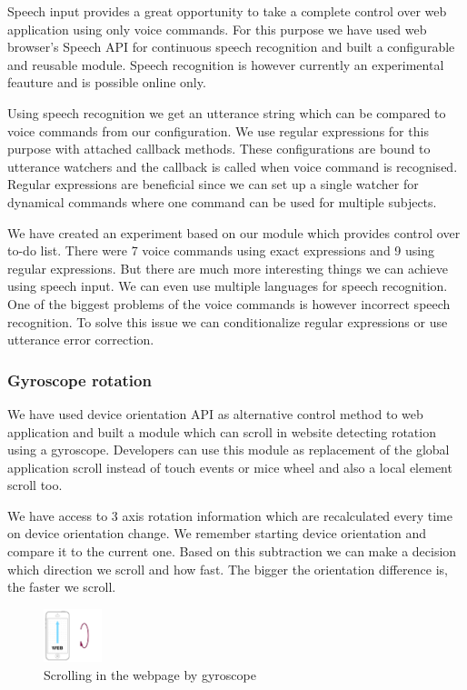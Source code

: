 \documentclass{iitsrc}
\begin{document}
Speech input provides a great opportunity to take a complete control over web application using only voice commands. For this purpose we have used web browser's Speech API for continuous speech recognition and built a configurable and reusable module. Speech recognition is however currently an experimental feauture and is possible online only.

Using speech recognition we get an utterance string which can be compared to voice commands from our configuration. We use regular expressions for this purpose with attached callback methods. These configurations are bound to utterance watchers and the callback is called when voice command is recognised. Regular expressions are beneficial since we can set up a single watcher for dynamical commands where one command can be used for multiple subjects.

We have created an experiment based on our module which provides control over to-do list. There were 7 voice commands using exact expressions and 9 using regular expressions. But there are much more interesting things we can achieve using speech input. We can even use multiple languages for speech recognition. One of the biggest problems of the voice commands is however incorrect speech recognition. To solve this issue we can conditionalize regular expressions or use utterance error correction.


\subsubsection*{Gyroscope rotation} %
\label{ssub:gyroscope_rotation}

We have used device orientation API as alternative control method to web application and built a module which can scroll in website detecting rotation using a gyroscope. Developers can use this module as replacement of the global application scroll instead of touch events or mice wheel and also a local element scroll too.

We have access to 3 axis rotation information which are recalculated every time on device orientation change. We remember starting device orientation and compare it to the current one. Based on this subtraction we can make a decision which direction we scroll and how fast. The bigger the orientation difference is, the faster we scroll.

\begin{figure}[ht]
    \begin{center}
        \includegraphics[width=0.15\textwidth]{../images/gyroscope}
        \caption{Scrolling in the webpage by gyroscope}
        \label{fig:gyroscope}
    \end{center}
\end{figure}
\end{document}

